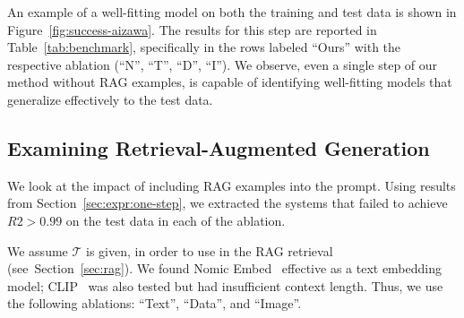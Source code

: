 \documentclass{article}
\begin{document}
An example of a well-fitting model on both the training and test data is shown in Figure~\ref{fig:success-aizawa}. 
The results for this step are reported in Table~\ref{tab:benchmark}, specifically in the rows labeled ``Ours'' with the respective ablation (``N'', ``T'', ``D'', ``I''). 
We observe, even a single step  of our method without RAG examples, is capable of identifying well-fitting models that generalize effectively to the test data.

\subsection{Examining Retrieval-Augmented Generation}

We look at the impact of including RAG examples into the prompt. 
Using results from Section~\ref{sec:expr:one-step}, we extracted the systems that failed to achieve $R2 > 0.99$ on the test data in each of the ablation.

We assume $\mathcal{T}$ is given, in order to use in the RAG retrieval (see~Section~\ref{sec:rag}).
We found  Nomic Embed~\cite{nussbaum2024nomicembedtrainingreproducible} effective as a text embedding model; 
CLIP~\cite{radford2021learning} was also tested but had insufficient context length.
Thus, we use the following ablations: ``Text'', ``Data'', and ``Image''.


 
\end{document}
